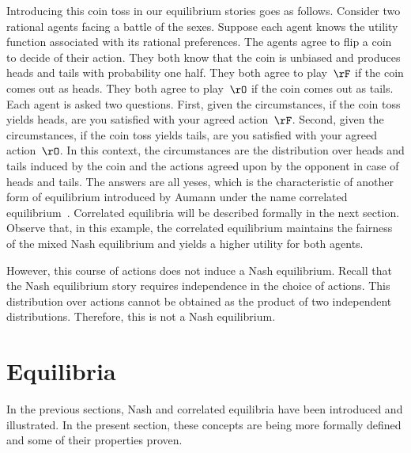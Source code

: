 \begin{figure}[htp]
\label{fig:bos_correlated}
\centering
{}
\end{figure}

Introducing this coin toss in our equilibrium stories goes as follows.
Consider two rational agents facing a battle of the sexes.
Suppose each agent knows the utility function associated with its rational preferences.
The agents agree to flip a coin to decide of their action.
They both know that the coin is unbiased and produces heads and tails with probability one half.
They both agree to play~\(\rF\) if the coin comes out as heads.
They both agree to play~\(\rO\) if the coin comes out as tails.
Each agent is asked two questions.
First, given the circumstances, if the coin toss yields heads, are you satisfied with your agreed action~\(\rF\).
Second, given the circumstances, if the coin toss yields tails, are you satisfied with your agreed action~\(\rO\).
In this context, the circumstances are the distribution over heads and tails induced by the coin and the actions agreed upon by the opponent in case of heads and tails.
The answers are all yeses, which is the characteristic of another form of equilibrium introduced by Aumann under the name correlated equilibrium~\cite{aumann:1974,aumann:1987}.
Correlated equilibria will be described formally in the next section.
Observe that, in this example, the correlated equilibrium maintains the fairness of the mixed Nash equilibrium and yields a higher utility for both agents.

However, this course of actions does not induce a Nash equilibrium.
Recall that the Nash equilibrium story requires independence in the choice of actions.
This distribution over actions cannot be obtained as the product of two independent distributions.
Therefore, this is not a Nash equilibrium.

\section{Equilibria}

In the previous sections, Nash and correlated equilibria have been introduced and illustrated.
In the present section, these concepts are being more formally defined and some of their properties proven.

